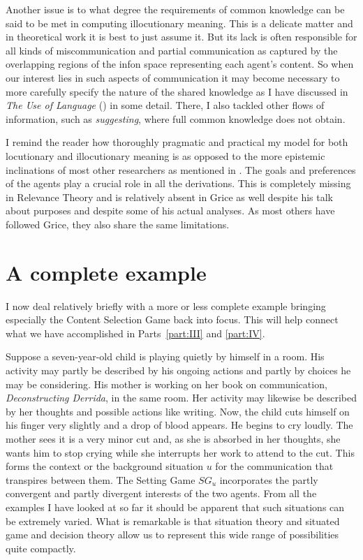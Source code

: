Another issue is to what degree the requirements of common knowledge can be said to be met in computing illocutionary meaning. This is a delicate matter and in theoretical work it is best to just assume it. But its lack is often responsible for all kinds of miscommunication and partial communication as captured by the overlapping regions of the infon space representing each agent's content. So when our interest lies in such aspects of communication it may become necessary to more carefully specify the nature of the shared knowledge as I have discussed in \emph{The Use of Language} (\citeyear[Chapters~5 and 6]{parikh:ul}) in some detail. There, I also  tackled other flows of information, such as \emph{suggesting}, where full common knowledge does not obtain.

I remind the reader how thoroughly pragmatic and practical my model for both locutionary and illocutionary meaning is as opposed to the more epistemic inclinations of most other researchers as mentioned in . The goals and preferences of the agents play a crucial role in all the derivations. This is completely missing in Relevance Theory and is relatively absent in Grice as well despite his talk about purposes and despite some of his actual analyses. As most others have followed Grice, they also share the same limitations.


\section{A complete example} \label{sec:a complete example}

I now deal relatively briefly with a more or less complete example bringing especially the Content Selection Game back into focus. This will help connect what we have accomplished in Parts~\ref{part:III} and \ref{part:IV}.

Suppose a seven-year-old child is playing quietly by himself in a room. His activity may partly be described by his ongoing actions and partly by choices he may be considering. His mother is working on her book on communication, \emph{Deconstructing Derrida}, in the same room. Her activity may likewise be described by her thoughts and possible actions like writing. Now, the child cuts himself on his finger very slightly and a drop of blood appears. He begins to cry loudly. The mother sees it is a very minor cut and, as she is absorbed in her thoughts, she wants him to stop crying while she interrupts her work to attend to the cut. This forms the context or the background situation $u$ for the communication that transpires between them. The Setting Game $SG_u$ incorporates the partly convergent and partly divergent interests of the two agents. From all the examples I have looked at so far it should be apparent that such situations can be extremely varied. What is remarkable is that situation theory and situated game and decision theory allow us to  represent this wide range of possibilities quite compactly.

